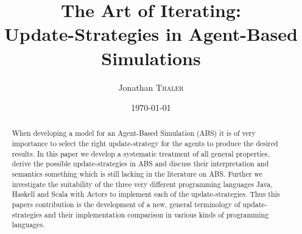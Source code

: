 \documentclass[twocolumn]{article}
\title{The Art of Iterating:\\Update-Strategies in Agent-Based Simulations} %
\author{Jonathan \textsc{Thaler}} %
\date{\today} %
\begin{document}
%
\maketitle %

\begin{abstract}
When developing a model for an Agent-Based Simulation (ABS) it is of very importance to select the right update-strategy for the agents to produce the desired results. In this paper we develop a systematic treatment of all general properties, derive the possible update-strategies in ABS and discuss their interpretation and semantics something which is still lacking in the literature on ABS. Further we investigate the suitability of the three very different programming languages Java, Haskell and  Scala with Actors to implement each of the update-strategies. Thus this papers contribution is the development of a new, general terminology of update-strategies and their implementation comparison in various kinds of programming languages.
\end{abstract}















\newpage



\end{document}
